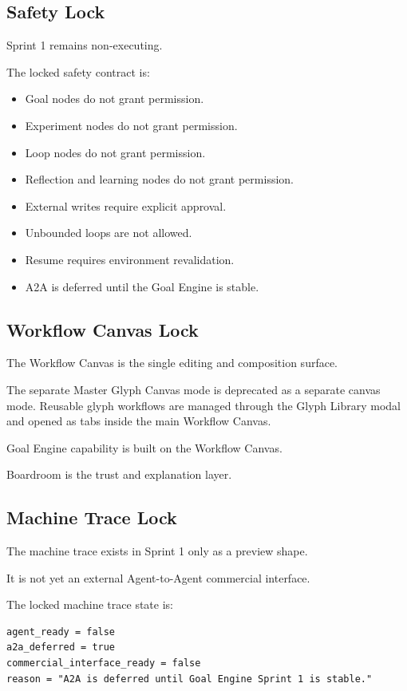 \subsection{Safety Lock}

Sprint 1 remains non-executing.

The locked safety contract is:

\begin{itemize}
  \item Goal nodes do not grant permission.
  \item Experiment nodes do not grant permission.
  \item Loop nodes do not grant permission.
  \item Reflection and learning nodes do not grant permission.
  \item External writes require explicit approval.
  \item Unbounded loops are not allowed.
  \item Resume requires environment revalidation.
  \item A2A is deferred until the Goal Engine is stable.
\end{itemize}

\subsection{Workflow Canvas Lock}

The Workflow Canvas is the single editing and composition surface.

The separate Master Glyph Canvas mode is deprecated as a separate canvas mode. Reusable glyph workflows are managed through the Glyph Library modal and opened as tabs inside the main Workflow Canvas.

Goal Engine capability is built on the Workflow Canvas.

Boardroom is the trust and explanation layer.

\subsection{Machine Trace Lock}

The machine trace exists in Sprint 1 only as a preview shape.

It is not yet an external Agent-to-Agent commercial interface.

The locked machine trace state is:

\begin{verbatim}
agent_ready = false
a2a_deferred = true
commercial_interface_ready = false
reason = "A2A is deferred until Goal Engine Sprint 1 is stable."
\end{verbatim}

